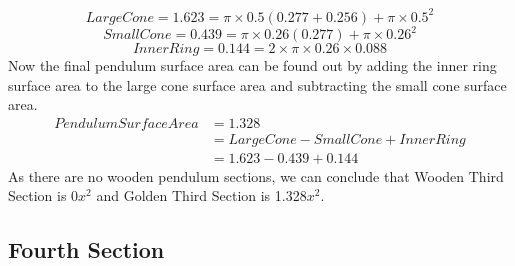 \documentclass[a4paper,12pt]{article}
\begin{document}
$$Large Cone = 1.623 = \pi\times0.5(0.277+0.256)+\pi\times0.5^2$$
$$Small Cone = 0.439 = \pi\times0.26(0.277)+\pi\times0.26^2$$
$$Inner Ring = 0.144 =2\times\pi\times0.26\times0.088$$
Now the final pendulum surface area can be found out by adding the inner ring surface area to the large cone surface area and subtracting the small cone surface area.
\begin{equation}
\begin{aligned} 
PendulumSurfaceArea &= 1.328 \\&= Large Cone - Small Cone + Inner Ring \\&= 1.623-0.439+0.144
\end{aligned}
\end{equation}
As there are no wooden pendulum sections, we can conclude that Wooden Third Section is 0$x^2$ and Golden Third Section is 1.328$x^2$.



\subsection{Fourth Section}
\end{document}
